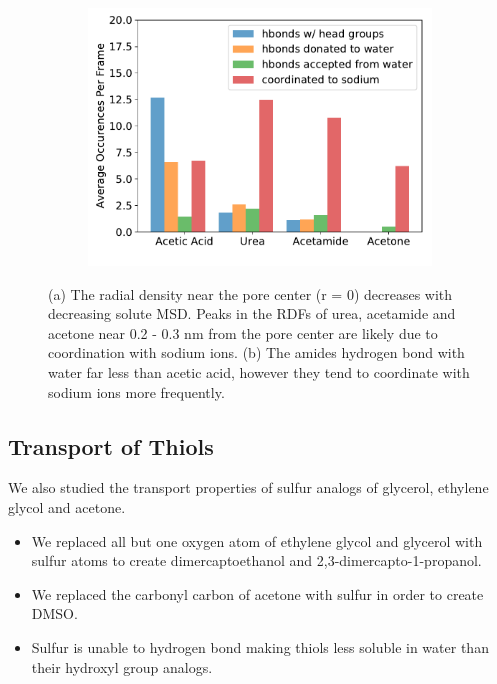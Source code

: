 \documentclass{article}
\begin{document}
\begin{figure}[!htb]
\begin{subfigure}{0.325\textwidth}
  \includegraphics[width=\textwidth]{ketone_hbonds.pdf}
  \caption{}\label{fig:ketone_hbonds}
  \end{subfigure}
  \caption{(a) The radial density near the pore center (r = 0) decreases
  with decreasing solute MSD. Peaks in the RDFs of urea, acetamide and
  acetone near 0.2 - 0.3 nm from the pore center are likely due to coordination
  with sodium ions. (b) The amides hydrogen bond with water far less than 
  acetic acid, however they tend to coordinate with sodium ions more 
  frequently.}\label{fig:ketones}
  \end{figure}
  
  \subsection*{Transport of Thiols}
  
  We also studied the transport properties of sulfur analogs of glycerol, ethylene
  glycol and acetone.
  \begin{itemize}
    \item We replaced all but one oxygen atom of ethylene glycol and glycerol with sulfur atoms
    to create dimercaptoethanol and 2,3-dimercapto-1-propanol.
    \item We replaced the carbonyl carbon of acetone with sulfur in order to create DMSO. 
  	\item Sulfur is unable to hydrogen bond making thiols less soluble in water than
  	their hydroxyl group analogs.  %
 \end{itemize}
  
\end{document}
